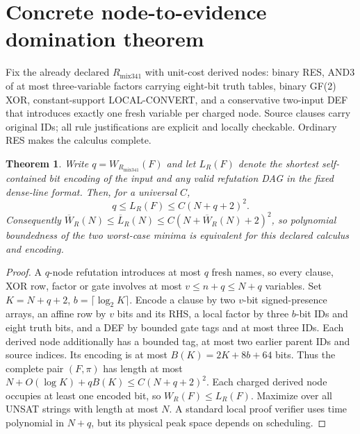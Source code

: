 \documentclass[11pt]{article}
\newtheorem{theorem}{Theorem}
\begin{document}
\section*{Concrete node-to-evidence domination theorem}
Fix the already declared $R_{\mathrm{mix341}}$ with unit-cost derived nodes: binary RES, AND3 of at most three-variable factors carrying eight-bit truth tables, binary GF(2) XOR, constant-support LOCAL-CONVERT, and a conservative two-input DEF that introduces exactly one fresh variable per charged node. Source clauses carry original IDs; all rule justifications are explicit and locally checkable. Ordinary RES makes the calculus complete.
\begin{theorem}
Write $q=W_{R_{\mathrm{mix341}}}(F)$ and let $L_R(F)$ denote the shortest self-contained bit encoding of the input and any valid refutation DAG in the fixed dense-line format. Then, for a universal $C$,
\[
\boxed{q\le L_R(F)\le C(N+q+2)^2.}
\]
Consequently $\overline W_R(N)\le \overline L_R(N)\le C(N+\overline W_R(N)+2)^2$, so polynomial boundedness of the two worst-case minima is equivalent for this declared calculus and encoding.
\end{theorem}
\begin{proof}
A $q$-node refutation introduces at most $q$ fresh names, so every clause, XOR row, factor or gate involves at most $v\le n+q\le N+q$ variables. Set $K=N+q+2$, $b=\lceil\log_2 K\rceil$. Encode a clause by two $v$-bit signed-presence arrays, an affine row by $v$ bits and its RHS, a local factor by three $b$-bit IDs and eight truth bits, and a DEF by bounded gate tags and at most three IDs. Each derived node additionally has a bounded tag, at most two earlier parent IDs and source indices. Its encoding is at most $B(K)=2K+8b+64$ bits. Thus the complete pair $(F,\pi)$ has length at most $N+O(\log K)+qB(K)\le C(N+q+2)^2$. Each charged derived node occupies at least one encoded bit, so $W_R(F)\le L_R(F)$. Maximize over all UNSAT strings with length at most $N$. A standard local proof verifier uses time polynomial in $N+q$, but its physical peak space depends on scheduling.
\end{proof}
\end{document}
